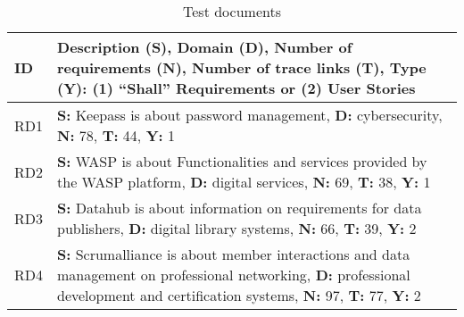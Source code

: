 \begin{table*}
\footnotesize
\centering
\caption{Test documents}
\label{tab:test-documents}
\begin{tabularx}{0.98\textwidth}
{@{} p{} 
*{1}{>{\arraybackslash}X}@{}
}
\toprule 
ID &  Description (\textbf{S}), Domain (\textbf{D}), Number of requirements (\textbf{N}), Number of trace links (\textbf{T}), Type (\textbf{Y}): (1) ``Shall'' Requirements or (2) User Stories   \\ 
\midrule
RD1 & \textbf{S:} Keepass is about password management, %
 \textbf{D:} cybersecurity, \textbf{N:} 78,  \textbf{T:} 44, \textbf{Y:} 1\\ 
RD2 & \textbf{S:} WASP is about Functionalities and services provided by the WASP platform, \textbf{D:} digital services, \textbf{N:} 69, \textbf{T:} 38, \textbf{Y:} 1\\ 
RD3 & \textbf{S:} Datahub is about information on requirements for data publishers, \textbf{D:}  digital library systems, \textbf{N:} 66, \textbf{T:} 39, \textbf{Y:} 2\\ 
RD4 & \textbf{S:} Scrumalliance is about member interactions and data management on professional networking,  \textbf{D:} professional development and certification systems, \textbf{N:} 97, \textbf{T:} 77, \textbf{Y:} 2\\ 
\bottomrule
\end{tabularx}
\end{table*}

